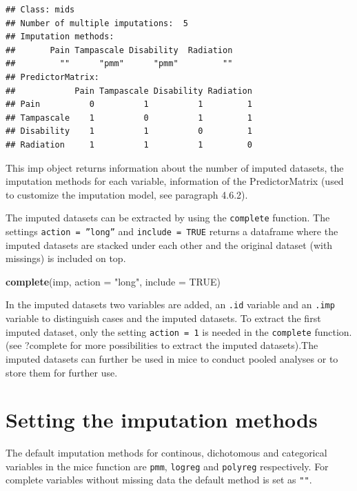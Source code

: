 \documentclass[
]{book}
\newenvironment{Shaded}{\begin{snugshade}}{\end{snugshade}}
\newcommand{\DataTypeTok}[1]{\textcolor[rgb]{0.13,0.29,0.53}{#1}}
\newcommand{\KeywordTok}[1]{\textcolor[rgb]{0.13,0.29,0.53}{\textbf{#1}}}
\newcommand{\NormalTok}[1]{#1}
\newcommand{\OtherTok}[1]{\textcolor[rgb]{0.56,0.35,0.01}{#1}}
\newcommand{\StringTok}[1]{\textcolor[rgb]{0.31,0.60,0.02}{#1}}
\begin{document}
\begin{verbatim}
## Class: mids
## Number of multiple imputations:  5 
## Imputation methods:
##       Pain Tampascale Disability  Radiation 
##         ""      "pmm"      "pmm"         "" 
## PredictorMatrix:
##            Pain Tampascale Disability Radiation
## Pain          0          1          1         1
## Tampascale    1          0          1         1
## Disability    1          1          0         1
## Radiation     1          1          1         0
\end{verbatim}

This imp object returns information about the number of imputed datasets, the imputation methods for each variable, information of the PredictorMatrix (used to customize the imputation model, see paragraph 4.6.2).

The imputed datasets can be extracted by using the \texttt{complete} function. The settings \texttt{action\ =\ ”long”} and \texttt{include\ =\ TRUE} returns a dataframe where the imputed datasets are stacked under each other and the original dataset (with missings) is included on top.

\begin{Shaded}
\begin{Highlighting}[]
\KeywordTok{complete}\NormalTok{(imp, }\DataTypeTok{action =} \StringTok{"long"}\NormalTok{, }\DataTypeTok{include =} \OtherTok{TRUE}\NormalTok{)}
\end{Highlighting}
\end{Shaded}

In the imputed datasets two variables are added, an \texttt{.id} variable and an \texttt{.imp} variable to distinguish cases and the imputed datasets. To extract the first imputed dataset, only the setting \texttt{action\ =\ 1} is needed in the \texttt{complete} function. (see ?complete for more possibilities to extract the imputed datasets).The imputed datasets can further be used in mice to conduct pooled analyses or to store them for further use.

\hypertarget{setting-the-imputation-methods}{%
\section{Setting the imputation methods}\label{setting-the-imputation-methods}}

The default imputation methods for continous, dichotomous and categorical variables in the mice function are \texttt{pmm}, \texttt{logreg} and \texttt{polyreg} respectively. For complete variables without missing data the default method is set as \texttt{""}.
\end{document}
